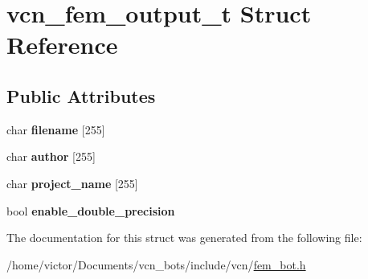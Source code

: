 \hypertarget{structvcn__fem__output__t}{\section{vcn\+\_\+fem\+\_\+output\+\_\+t Struct Reference}
\label{structvcn__fem__output__t}
}
\subsection*{Public Attributes}
\begin{DoxyCompactItemize}
\item 
\hypertarget{structvcn__fem__output__t_afac05401930262557db0055d13cc483f}{char {\bfseries filename} \mbox{[}255\mbox{]}}\label{structvcn__fem__output__t_afac05401930262557db0055d13cc483f}

\item 
\hypertarget{structvcn__fem__output__t_ac23a01a521d3eabf8431e6a72ac4ffd8}{char {\bfseries author} \mbox{[}255\mbox{]}}\label{structvcn__fem__output__t_ac23a01a521d3eabf8431e6a72ac4ffd8}

\item 
\hypertarget{structvcn__fem__output__t_ae06ab6444779efdbadb8e4f4038fdc67}{char {\bfseries project\+\_\+name} \mbox{[}255\mbox{]}}\label{structvcn__fem__output__t_ae06ab6444779efdbadb8e4f4038fdc67}

\item 
\hypertarget{structvcn__fem__output__t_ad1aef1050b7494589921238f13501bc0}{bool {\bfseries enable\+\_\+double\+\_\+precision}}\label{structvcn__fem__output__t_ad1aef1050b7494589921238f13501bc0}

\end{DoxyCompactItemize}


The documentation for this struct was generated from the following file\+:\begin{DoxyCompactItemize}
\item 
/home/victor/\+Documents/vcn\+\_\+bots/include/vcn/\hyperlink{fem__bot_8h}{fem\+\_\+bot.\+h}\end{DoxyCompactItemize}

